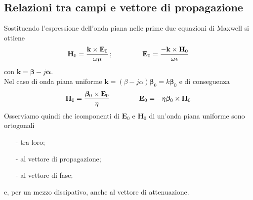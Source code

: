 \documentclass[a4paper]{article}
\begin{document}
\subsection*{Relazioni tra campi e vettore di propagazione}
Sostituendo l'espressione dell'onda piana nelle prime due equazioni di Maxwell si ottiene
\begin{equation*}
\textbf{H}_0=\frac{\textbf{k}\times\textbf{E}_0}{\omega\mu}\,;\hspace{15mm}\textbf{E}_0=\frac{-\textbf{k}\times\textbf{H}_0}{\omega\epsilon}
\end{equation*}
con $\textbf{k}=\bm{\beta}-j\bm{\alpha}$.\\
Nel caso di onda piana uniforme $\textbf{k}=(\beta-j\alpha)\bm{\beta}_0=k\bm{\beta}_0$ e di conseguenza
\begin{equation*}
\textbf{H}_0=\frac{\bm{\beta}_0\times\textbf{E}_0}{\eta}\hspace{15mm}\textbf{E}_0=-\eta\bm{\beta}_0\times\textbf{H}_0
\end{equation*}
Osserviamo quindi che icomponenti di $\textbf{E}_0$ e $\textbf{H}_0$ di un'onda piana uniforme sono ortogonali
\begin{itemize}
\item[-] tra loro;
\item[-] al vettore di propagazione;
\item[-] al vettore di fase;
\end{itemize}
e, per un mezzo dissipativo, anche al vettore di attenuazione.
\end{document}
